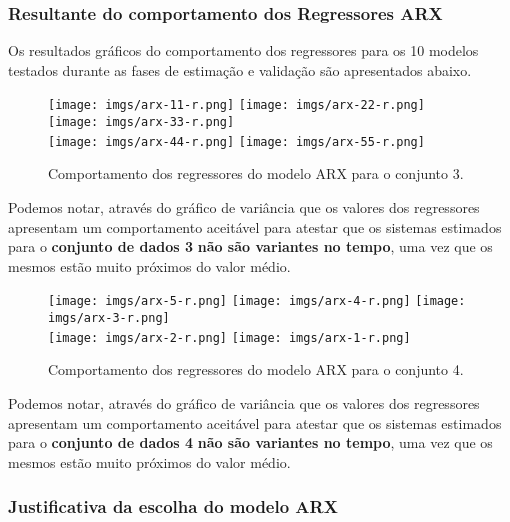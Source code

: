 \documentclass[a4paper,12pt]{article}
\begin{document}
\subsubsection{Resultante do comportamento dos Regressores ARX}

Os resultados gráficos do comportamento dos regressores para os 10 modelos testados durante as fases de estimação e validação são apresentados abaixo.
\begin{figure}[h!]
\centering

\texttt{[image: imgs/arx-11-r.png]} \quad
\texttt{[image: imgs/arx-22-r.png]} \quad
\texttt{[image: imgs/arx-33-r.png]} \\

\texttt{[image: imgs/arx-44-r.png]} \quad
\texttt{[image: imgs/arx-55-r.png]}

\caption{Comportamento dos regressores do modelo ARX para o conjunto 3.}
\end{figure}

Podemos notar, através do gráfico de variância que os valores dos regressores apresentam um comportamento aceitável para atestar que os sistemas estimados para o \textbf{conjunto de dados 3} \textbf{não são variantes no tempo}, uma vez que os mesmos estão muito próximos do valor médio.

\begin{figure}[h!]
\centering

\texttt{[image: imgs/arx-5-r.png]} \quad
\texttt{[image: imgs/arx-4-r.png]} \quad
\texttt{[image: imgs/arx-3-r.png]} \\

\texttt{[image: imgs/arx-2-r.png]} \quad
\texttt{[image: imgs/arx-1-r.png]}

\caption{Comportamento dos regressores do modelo ARX para o conjunto 4.}
\end{figure}

Podemos notar, através do gráfico de variância que os valores dos regressores apresentam um comportamento aceitável para atestar que os sistemas estimados para o \textbf{conjunto de dados 4} \textbf{não são variantes no tempo}, uma vez que os mesmos estão muito próximos do valor médio.

\subsubsection{Justificativa da escolha do modelo ARX}
\end{document}
